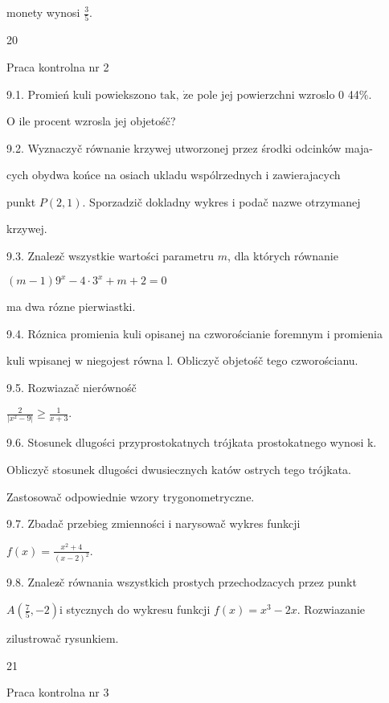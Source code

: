 \documentclass[a4paper,12pt]{article}
\begin{document}
monety wynosi $\displaystyle \frac{3}{5}.$





20

Praca kontrolna nr 2

9.1. Promień kuli powiekszono $\mathrm{t}\mathrm{a}\mathrm{k},\ \dot{\mathrm{z}}\mathrm{e}$ pole jej powierzchni wzroslo $0$ 44\%.

$\mathrm{O}$ ile procent wzrosla jej objetośč?

9.2. Wyznaczyč równanie krzywej utworzonej przez środki odcinków maja-

cych obydwa końce na osiach ukladu wspólrzednych $\mathrm{i}$ zawierajacych

punkt $P(2,1)$. Sporzadzič dokladny wykres $\mathrm{i}$ podač nazwe otrzymanej

krzywej.

9.3. Znalez$\acute{}$č wszystkie wartości parametru $m$, dla których równanie

$(m-1)9^{x}-4\cdot 3^{x}+m+2=0$

ma dwa rózne pierwiastki.

9.4. Róznica promienia kuli opisanej na czworościanie foremnym $\mathrm{i}$ promienia

kuli wpisanej $\mathrm{w}$ niegojest równa l. Obliczyč objetośč tego czworościanu.

9.5. Rozwiazač nierównośč

$\displaystyle \frac{2}{|x^{2}-9|}\geq\frac{1}{x+3}.$

9.6. Stosunek dlugości przyprostokatnych trójkata prostokatnego wynosi k.

Obliczyč stosunek dlugości dwusiecznych katów ostrych tego trójkata.

Zastosowač odpowiednie wzory trygonometryczne.

9.7. Zbadač przebieg zmienności i narysowač wykres funkcji

$f(x)=\displaystyle \frac{x^{2}+4}{(x-2)^{2}}.$

9.8. Znalez$\acute{}$č równania wszystkich prostych przechodzacych przez punkt

$A(\displaystyle \frac{7}{5},-2)\mathrm{i}$ stycznych do wykresu funkcji $f(x)=x^{3}-2x$. Rozwiazanie

zilustrowač rysunkiem.





21

Praca kontrolna nr 3
\end{document}
